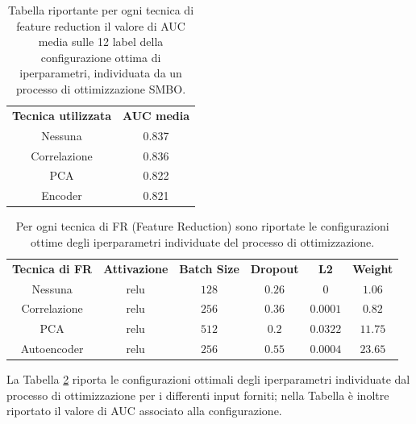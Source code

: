 \begin{table}[!b]
	\centering
	\caption{Tabella riportante per ogni tecnica di feature reduction il valore di AUC media sulle 12 label della configurazione ottima di iperparametri, individuata da un processo di ottimizzazione SMBO.}
	\begin{tabular}{c|c}
		\label{tab:bestseen}
		\textbf{Tecnica utilizzata} & \textbf{AUC media} \\
		Nessuna & 0.837 \\ 
		Correlazione & 0.836 \\ 
		PCA & 0.822 \\ 
		Encoder & 0.821 \\ 
	\end{tabular}
\end{table}
\begin{table}[!h]
	\centering
	\caption{Per ogni tecnica di FR (Feature Reduction) sono riportate le configurazioni ottime degli iperparametri individuate del processo di ottimizzazione.}
	\begin{tabular}{|c|c|c|c|c|c|}
		\label{tab:hporesult}
		\textbf{Tecnica di FR} & \textbf{Attivazione} & \textbf{Batch Size} & \textbf{Dropout} & \textbf{L2} & \textbf{Weight} \\
		Nessuna & relu & $128$ & $0.26$ & $0$ & $1.06$ \\ 
		Correlazione & relu & $256$ & $0.36$ & $0.0001$ & $0.82$ \\ 
		PCA & relu & $512$ & $0.2$ & $0.0322$ & $11.75$ \\ 
		Autoencoder & relu & $256$ & $0.55$ & $0.0004$ & $23.65$ \\ 
	\end{tabular} 
\end{table}
La Tabella \ref{tab:hporesult} riporta le configurazioni ottimali degli iperparametri individuate dal processo di ottimizzazione per i differenti input forniti; nella Tabella è inoltre riportato il valore di AUC associato alla configurazione.
